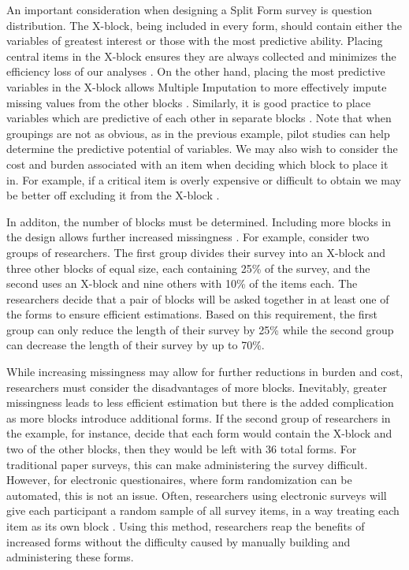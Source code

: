 \documentclass{svjour3}                     %
\begin{document}
An important consideration when designing a Split Form survey is question distribution. The X-block, being included in every form, should contain either the variables of greatest interest or those with the most predictive ability.
Placing central items in the X-block ensures they are always collected and minimizes the efficiency loss of our analyses \citep{thomas2006evaluation}. On the other hand, placing the most predictive variables in the X-block allows Multiple Imputation to more effectively impute missing values from the other blocks \citep{gottschall2012comparison}. Similarly, it is good practice to place variables which are predictive of each other in separate blocks \citep{gottschall2012comparison}. Note that when groupings are not as obvious, as in the previous example, pilot studies can help determine the predictive potential of variables. We may also wish to consider the cost and burden associated with an item when deciding which block to place it in. For example, if a critical item is overly expensive or difficult to obtain we may be better off excluding it from the X-block \citep{little2013planned}. \par


In additon, the number of blocks must be determined. Including more blocks in the design allows further increased missingness \citep{graham2006planned}. For example, consider two groups of researchers. The first group divides their survey into an X-block and three other blocks of equal size, each containing 25\% of the survey, and the second uses an X-block and nine others with 10\% of the items each. The researchers decide that a pair of blocks will be asked together in at least one of the forms to ensure efficient estimations. Based on this requirement, the first group can only reduce the length of their survey by 25\% while the second group can decrease the length of their survey by up to 70\%. \par

While increasing missingness may allow for further reductions in burden and cost, researchers must consider the disadvantages of more blocks. Inevitably, greater missingness leads to less efficient estimation \citep{rhemtulla2016asymptotic} but there is the added complication as more blocks introduce additional forms. If the second group of researchers in the example, for instance, decide that each form would contain the X-block and two of the other blocks, then they would be left with 36 total forms. For traditional paper surveys, this can make administering the survey difficult. However, for electronic questionaires, where form randomization can be automated, this is not an issue. Often, researchers using electronic surveys will give each participant a random sample of all survey items, in a way treating each item as its own block \citep{silvia2014planned}. Using this method, researchers reap the benefits of increased forms without the difficulty caused by manually building and administering these forms. \par
\end{document}
